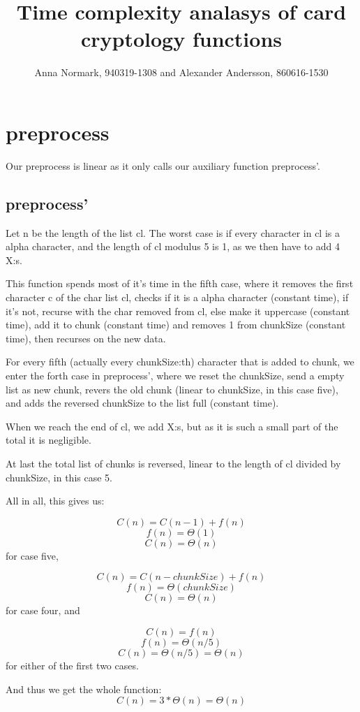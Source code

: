 \documentclass[12pt, a4paper]{article}
\title{Time complexity analasys of card cryptology functions}
\author{Anna Normark, 940319-1308 and Alexander Andersson, 860616-1530}
\begin{document}
\maketitle



\section{preprocess}
Our preprocess is linear as it only calls our auxiliary function preprocess'.

\subsection{preprocess'}
Let n be the length of the list cl. The worst case is if every character in cl is a alpha character, and the length of cl modulus 5 is 1, as we then have to add 4 X:s.

This function spends most of it's time in the fifth case, where it removes the first character c of the char list cl, checks if it is a alpha character (constant time), if it's not, recurse with the char removed from cl, else make it uppercase (constant time), add it to chunk (constant time) and removes 1 from chunkSize (constant time), then recurses on the new data.

For every fifth (actually every chunkSize:th) character that is added to chunk, we enter the forth case in preprocess', where we reset the chunkSize, send a empty list as new chunk, revers the old chunk (linear to chunkSize, in this case five), and adds the reversed chunkSize to the list full (constant time).

When we reach the end of cl, we add X:s, but as it is such a small part of the total it is negligible.

At last the total list of chunks is reversed, linear to the length of cl divided by chunkSize, in this case 5.

All in all, this gives us:

$$C(n) = C(n-1) + f(n)$$
$$f(n) = \Theta(1)$$
$$C(n) = \Theta(n)$$ for case five,


$$C(n) = C(n - chunkSize) + f(n)$$
$$f(n) = \Theta(chunkSize)$$
$$C(n) = \Theta(n)$$ for case four, and

$$C(n) = f(n)$$
$$f(n) = \Theta(n/5)$$
$$C(n) = \Theta(n/5) = \Theta(n)$$ for either of the first two cases.

And thus we get the whole function:
$$C(n) = 3 * \Theta(n) = \Theta(n)$$
\end{document}
